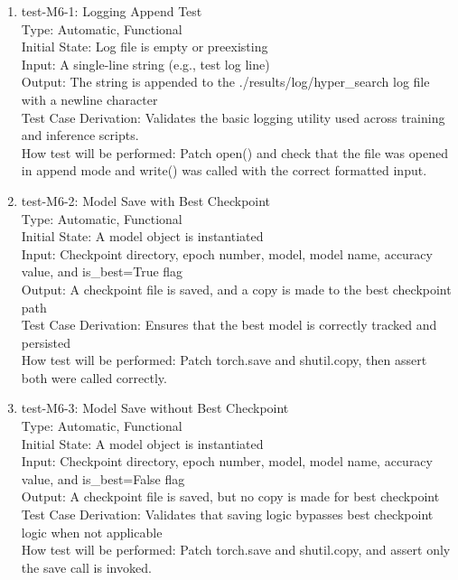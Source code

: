 \documentclass[12pt, titlepage]{article}
\begin{document}
\begin{enumerate}

\item{test-M6-1: Logging Append Test\\}
Type: Automatic, Functional \\
Initial State: Log file is empty or preexisting \\
Input: A single-line string (e.g., test log line) \\
Output: The string is appended to the ./results/log/hyper\_search log file with a newline character \\
Test Case Derivation: Validates the basic logging utility used across training and inference scripts. \\
How test will be performed: Patch open() and check that the file was opened in append mode and write() was called with the correct formatted input.

\item{test-M6-2: Model Save with Best Checkpoint\\}
Type: Automatic, Functional \\
Initial State: A model object is instantiated \\
Input: Checkpoint directory, epoch number, model, model name, accuracy value, and is\_best=True flag \\
Output: A checkpoint file is saved, and a copy is made to the best checkpoint path \\
Test Case Derivation: Ensures that the best model is correctly tracked and persisted \\
How test will be performed: Patch torch.save and shutil.copy, then assert both were called correctly.

\item{test-M6-3: Model Save without Best Checkpoint\\}
Type: Automatic, Functional \\
Initial State: A model object is instantiated \\
Input: Checkpoint directory, epoch number, model, model name, accuracy value, and is\_best=False flag \\
Output: A checkpoint file is saved, but no copy is made for best checkpoint \\
Test Case Derivation: Validates that saving logic bypasses best checkpoint logic when not applicable \\
How test will be performed: Patch torch.save and shutil.copy, and assert only the save call is invoked.


\end{enumerate}
\end{document}
